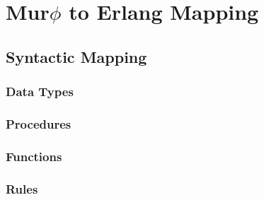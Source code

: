 \chapter{Mur$\phi$ to Erlang Mapping}

\section{Syntactic Mapping}

\subsection{Data Types}

\subsection{Procedures}

\subsection{Functions}

\subsection{Rules}


%